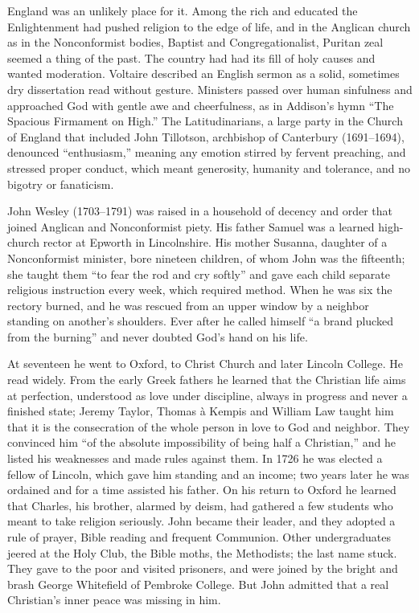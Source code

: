 England was an unlikely place for it. Among the rich and educated the Enlightenment had pushed
religion to the edge of life, and in the Anglican church as in the Nonconformist bodies, Baptist and
Congregationalist, Puritan zeal seemed a thing of the past. The country had had its fill of holy
causes and wanted moderation. Voltaire described an English sermon as a solid, sometimes dry
dissertation read without gesture. Ministers passed over human sinfulness and approached God with
gentle awe and cheerfulness, as in Addison's hymn ``The Spacious Firmament on High.'' The
Latitudinarians, a large party in the Church of England that included John Tillotson, archbishop of
Canterbury (1691--1694), denounced ``enthusiasm,'' meaning any emotion stirred by fervent preaching,
and stressed proper conduct, which meant generosity, humanity and tolerance, and no bigotry or fanaticism.

John Wesley (1703--1791) was raised in a household of decency and order that joined Anglican and Nonconformist
piety. His father Samuel was a learned high-church rector at Epworth in Lincolnshire. His mother
Susanna, daughter of a Nonconformist minister, bore nineteen children, of whom John was the
fifteenth; she taught them ``to fear the rod and cry softly'' and gave each child separate religious
instruction every week, which required method. When he was six the rectory burned, and he was rescued
from an upper window by a neighbor standing on another's shoulders. Ever after he called himself ``a
brand plucked from the burning'' and never doubted God's hand on his life.

At seventeen he went to Oxford, to Christ Church and later Lincoln College. He read widely. From the early Greek fathers he learned that the Christian life aims at perfection, understood as love under discipline, always in progress and never a finished state; Jeremy Taylor, Thomas \`a Kempis and William Law taught him
that it is the consecration of the whole person in love to God and neighbor. They convinced him ``of
the absolute impossibility of being half a Christian,'' and he listed his weaknesses and made rules
against them. In 1726 he was elected a fellow of Lincoln, which gave him standing and an income; two
years later he was ordained and for a time assisted his father. On his return to Oxford he learned that Charles, his brother, alarmed by deism, had gathered a few students who meant to take religion seriously.
John became their leader, and they adopted a rule of prayer, Bible reading and frequent Communion.
Other undergraduates jeered at the Holy Club, the Bible moths, the Methodists; the last name stuck.
They gave to the poor and visited prisoners, and were joined by the bright and brash George
Whitefield of Pembroke College. But John admitted that a real Christian's inner peace was missing in him.

